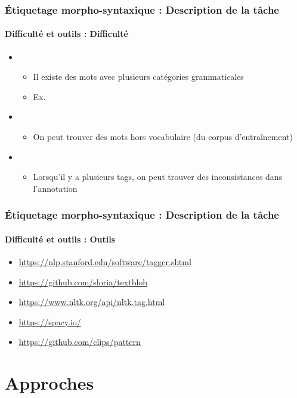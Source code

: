 \documentclass[xcolor=table]{beamer}
\begin{document}
\begin{frame}
\frametitle{Étiquetage morpho-syntaxique : Description de la tâche}
\framesubtitle{Difficulté et outils : Difficulté}

\begin{itemize}
	\item {}
	\begin{itemize}
		\item Il existe des mots avec plusieurs catégories grammaticales
		\item Ex. 
	\end{itemize}
	\item {}
	\begin{itemize}
		\item On peut trouver des mots hors vocabulaire (du corpus d'entraînement)
	\end{itemize}
	\item {} 
	\begin{itemize}
		\item Lorsqu'il y a plusieurs tags, on peut trouver des inconsistances dans l'annotation
	\end{itemize}
\end{itemize}

\end{frame}

\begin{frame}
\frametitle{Étiquetage morpho-syntaxique : Description de la tâche}
\framesubtitle{Difficulté et outils : Outils}

\begin{itemize}
	\item \url{https://nlp.stanford.edu/software/tagger.shtml}
	\item \url{https://github.com/sloria/textblob}
	\item \url{https://www.nltk.org/api/nltk.tag.html}
	\item \url{https://spacy.io/}
	\item \url{https://github.com/clips/pattern}
\end{itemize}

\end{frame}

\section{Approches}
\end{document}
